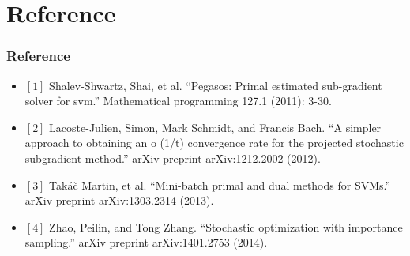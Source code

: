 \section{Reference}
\begin{frame}[fragile]
\frametitle{Reference}
\begin{itemize}
\item[] $\left[1\right]$ Shalev-Shwartz, Shai, et al. ``Pegasos: Primal estimated sub-gradient solver for svm.'' Mathematical programming 127.1 (2011): 3-30. 

\item[] $\left[2\right]$ Lacoste-Julien, Simon, Mark Schmidt, and Francis Bach. ``A simpler approach to obtaining an o (1/t) convergence rate for the projected stochastic subgradient method.'' arXiv preprint arXiv:1212.2002 (2012).

\item[] $\left[3\right]$  Tak\'a\v{c} Martin, et al. ``Mini-batch primal and dual methods for SVMs.'' arXiv preprint arXiv:1303.2314 (2013).
\item[] $\left[4\right]$ Zhao, Peilin, and Tong Zhang. ``Stochastic optimization with importance sampling.'' arXiv preprint arXiv:1401.2753 (2014).
\end{itemize}
\end{frame}


